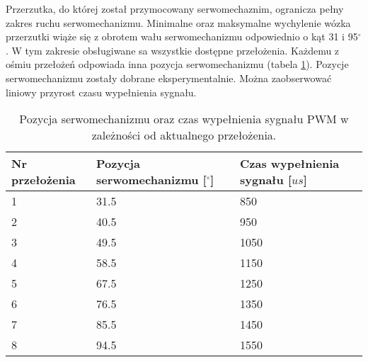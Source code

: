 Przerzutka, do której został przymocowany serwomechaznim, ogranicza pełny zakres ruchu serwomechanizmu. Minimalne oraz maksymalne wychylenie wózka przerzutki wiąże się z obrotem wału serwomechanizmu odpowiednio o kąt 31 i 95$^{\circ}$. W tym zakresie obsługiwane sa wszystkie dostępne przełożenia. Każdemu z ośmiu przełożeń odpowiada inna pozycja serwomechanizmu (tabela \ref{tab:przelozenia}). Pozycje serwomechanizmu zostały dobrane eksperymentalnie. Można zaobserwować liniowy przyrost czasu wypełnienia sygnału. 
\begin{table}[h]
    \caption{Pozycja serwomechanizmu oraz czas wypełnienia sygnału PWM w zależności od aktualnego przełożenia.}
    \begin{center}
		\label{tab:przelozenia}
		\begin{tabular}{|m{2.5cm}|m{5cm}|m{5cm}|}
			\hline
 			Nr przełożenia & Pozycja serwomechanizmu [$^{\circ}$] & Czas wypełnienia sygnału [$us$] \\
 			\hline
 			1 & 31.5 & 850 \\  
			2 & 40.5 & 950 \\
			3 & 49.5 & 1050 \\  
			4 & 58.5 & 1150 \\  
			5 & 67.5 & 1250 \\  
			6 & 76.5 & 1350 \\  
			7 & 85.5 & 1450 \\  
			8 & 94.5 & 1550 \\  
			\hline
		\end{tabular}
	\end{center}
\end{table}

